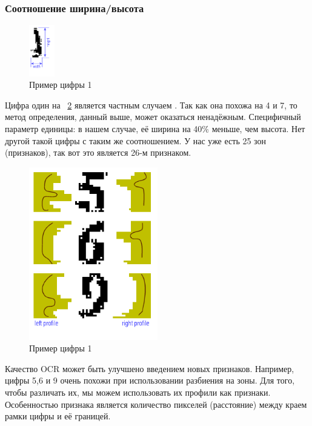 \subsubsection{Соотношение ширина/высота}

\begin{figure}[ht!]
  \centering
  \includegraphics[width=0.1\textwidth]{inc/raster/design2-12.png}
  \caption{Пример цифры 1}
  \label{fig:fig212}
\end{figure}
Цифра один на ~\ref{fig:fig212} является частным случаем . Так как она похожа на 4 и 7, то метод определения, данный выше, может оказаться ненадёжным. Специфичный параметр единицы: в нашем случае, её ширина на 40\% меньше, чем высота. Нет другой такой цифры с таким же соотношением. У нас уже есть 25 зон (признаков), так вот это является 26-м признаком.

\begin{figure}[ht!]
  \centering
  \includegraphics[width=0.5\textwidth]{inc/raster/design2-13.png}
  \caption{Пример цифры 1}
  \label{fig:fig212}
\end{figure}
Качество OCR может быть улучшено введением новых признаков. Например, цифры 5,6 и 9 очень похожи при использовании разбиения на зоны. Для того, чтобы различать их, мы можем использовать их профили как признаки. Особенностью признака является количество пикселей (расстояние) между краем рамки цифры и её границей.

